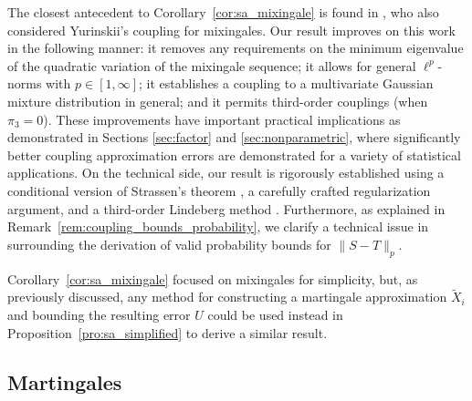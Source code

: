 The closest antecedent to Corollary~\ref{cor:sa_mixingale} is found in
\citet[Theorem~4]{li2020uniform}, who also considered Yurinskii's coupling for
mixingales. Our result improves on this work in the following manner: it
removes any requirements on the minimum eigenvalue of the quadratic variation
of the mixingale sequence; it allows for general $\ell^p$-norms with
$p\in[1,\infty]$; it establishes a coupling to a multivariate Gaussian
mixture distribution in general; and it permits third-order couplings
(when $\pi_3=0$). These improvements have important practical implications as
demonstrated in Sections \ref{sec:factor} and \ref{sec:nonparametric},
where significantly better coupling approximation
errors are demonstrated for a variety of statistical applications. On the
technical side, our result is rigorously established using a conditional
version of Strassen's theorem \citep{chen2020jackknife}, a carefully crafted
regularization argument, and a third-order Lindeberg method
\citep[see][and references therein, for more discussion on the
standard second-order Lindeberg method]{chatterjee2006generalization}.
Furthermore, as explained in Remark~\ref{rem:coupling_bounds_probability}, we
clarify a technical issue in \citet{li2020uniform} surrounding the derivation
of valid probability bounds for $\|S-T\|_p$.

Corollary~\ref{cor:sa_mixingale} focused on mixingales for simplicity, but, as
previously discussed, any method for constructing a martingale approximation
$\tilde X_i$ and bounding the resulting error $U$ could be used instead in
Proposition~\ref{pro:sa_simplified} to derive a similar result.

\subsection{Martingales}\label{sec:martingales}

